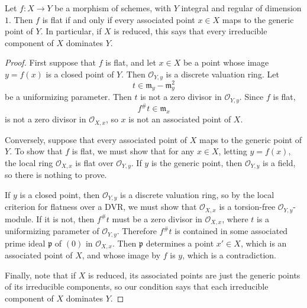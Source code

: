\documentclass[12pt]{article}
\begin{document}
\begin{proposition}\label{prop:flat-over-curve}
    Let $f\colon X \to Y$ be a morphism of schemes, with $Y$ integral and regular of dimension $1$. Then $f$ is flat if and only if every associated point $x \in X$ maps to the generic point of $Y$. In particular, if $X$ is reduced, this says that every irreducible component of $X$ dominates $Y$.
\end{proposition}

\begin{proof}
    First suppose that $f$ is flat, and let $x \in X$ be a point whose image $y=f(x)$ is a closed point of $Y$. Then $\mathcal O_{Y,y}$ is a discrete valuation ring. Let
    \[
        t \in \mathfrak m_y - \mathfrak m_y^2
    \]
    be a uniformizing parameter. Then $t$ is not a zero divisor in $\mathcal O_{Y,y}$. Since $f$ is flat,
    \[
        f^\#t \in \mathfrak m_x
    \]
    is not a zero divisor in $\mathcal O_{X,x}$, so $x$ is not an associated point of $X$.

    Conversely, suppose that every associated point of $X$ maps to the generic point of $Y$. To show that $f$ is flat, we must show that for any $x \in X$, letting $y=f(x)$, the local ring $\mathcal O_{X,x}$ is flat over $\mathcal O_{Y,y}$. If $y$ is the generic point, then $\mathcal O_{Y,y}$ is a field, so there is nothing to prove.

    If $y$ is a closed point, then $\mathcal O_{Y,y}$ is a discrete valuation ring, so by the local criterion for flatness over a DVR, we must show that $\mathcal O_{X,x}$ is a torsion-free $\mathcal O_{Y,y}$-module. If it is not, then $f^\#t$ must be a zero divisor in $\mathcal O_{X,x}$, where $t$ is a uniformizing parameter of $\mathcal O_{Y,y}$. Therefore $f^\#t$ is contained in some associated prime ideal $\mathfrak p$ of $(0)$ in $\mathcal O_{X,x}$. Then $\mathfrak p$ determines a point $x' \in X$, which is an associated point of $X$, and whose image by $f$ is $y$, which is a contradiction.

    Finally, note that if $X$ is reduced, its associated points are just the generic points of its irreducible components, so our condition says that each irreducible component of $X$ dominates $Y$.
\end{proof}
\end{document}
